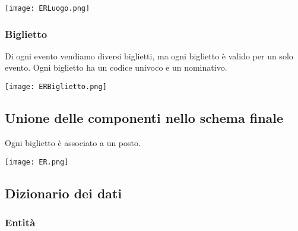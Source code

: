 \documentclass[a4paper,11pt]{article}
\begin{document}
\vspace*{.5em}
\texttt{[image: ERLuogo.png]}

\subsubsection*{Biglietto}

Di ogni evento vendiamo diversi biglietti, ma ogni biglietto è valido per un solo evento.
Ogni biglietto ha un codice univoco e un nominativo.

\vspace*{.5em}
\texttt{[image: ERBiglietto.png]}

\subsection{Unione delle componenti nello schema finale}

Ogni biglietto è associato a un posto.

\vspace*{1em}
\texttt{[image: ER.png]}

\subsection{Dizionario dei dati}

\subsubsection*{Entità}
\end{document}
